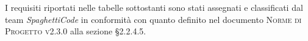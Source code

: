 \documentclass[../analisi_dei_requisiti.tex]{subfiles}
\begin{document}
I requisiti riportati nelle tabelle sottostanti sono stati assegnati e classificati dal team \emph{SpaghettiCode} in conformità con quanto definito
nel documento \textsc{Norme di Progetto v2.3.0} alla sezione \S2.2.4.5.



\newpage



\newpage



\newpage



\newpage



\newpage



\newpage


\end{document}

